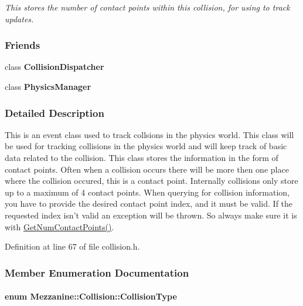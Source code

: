 \begin{DoxyCompactItemize}
\begin{DoxyCompactList}\small\item\em This stores the number of contact points within this collision, for using to track updates. \item\end{DoxyCompactList}\end{DoxyCompactItemize}
\subsubsection*{Friends}
\begin{DoxyCompactItemize}
\item 
\hypertarget{classMezzanine_1_1Collision_aa4a13416efe17e957deb2cf4dcce3a60}{
class {\bfseries CollisionDispatcher}}
\label{classMezzanine_1_1Collision_aa4a13416efe17e957deb2cf4dcce3a60}

\item 
\hypertarget{classMezzanine_1_1Collision_a139cf05ac01161b7071c8a037c841683}{
class {\bfseries PhysicsManager}}
\label{classMezzanine_1_1Collision_a139cf05ac01161b7071c8a037c841683}

\end{DoxyCompactItemize}


\subsubsection{Detailed Description}
This is an event class used to track collsions in the physics world. This class will be used for tracking collisions in the physics world and will keep track of basic data related to the collision. This class stores the information in the form of contact points. Often when a collision occurs there will be more then one place where the collision occured, this is a contact point. Internally collisions only store up to a maximum of 4 contact points. When querying for collision information, you have to provide the desired contact point index, and it must be valid. If the requested index isn't valid an exception will be thrown. So always make sure it is with \hyperlink{classMezzanine_1_1Collision_a75c8f35acf6ceba61b62da0049dcbf1c}{GetNumContactPoints()}. 

Definition at line 67 of file collision.h.



\subsubsection{Member Enumeration Documentation}
\hypertarget{classMezzanine_1_1Collision_aacdbb06153734d3645f4c806dbf90153}{
\paragraph[{CollisionType}]{\setlength{\rightskip}{0pt plus 5cm}enum {\bf Mezzanine::Collision::CollisionType}}\hfill}
\label{classMezzanine_1_1Collision_aacdbb06153734d3645f4c806dbf90153}


